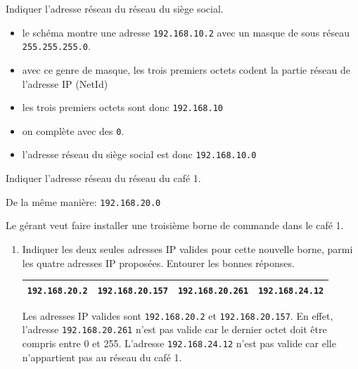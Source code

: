 \documentclass[11pt, a4paper]{report}
\begin{document}
\begin{enumerate}
        \item Indiquer l'adresse réseau du réseau du siège social. 

    \begin{blocvisible}[height=3.5]
        \begin{itemize}
        \item le schéma montre une adresse \verb|192.168.10.2| avec un masque de sous réseau \verb|255.255.255.0|.
        \item avec ce genre de masque, les trois premiers octets codent la partie réseau de l'adresse IP (NetId)
        \item les trois premiers octets sont donc \verb|192.168.10|
        \item on complète avec des \verb|0|.
        \item l'adresse réseau du siège social est donc \verb|192.168.10.0|
        \end{itemize}
       \end{blocvisible}

\begin{minipage}{0.48\linewidth}
    \item Indiquer l'adresse réseau du réseau du café 1. 
\end{minipage}\hfill
    \begin{minipage}{0.48\linewidth}
            \begin{blocvisible}[height=1]
 De la même manière: \verb|192.168.20.0|   \end{blocvisible}
\end{minipage}

\end{enumerate}

\medskip

Le gérant veut faire installer une troisième borne de commande dans le café 1.

\begin{enumerate}[resume]
    \item Indiquer les deux seules adresses IP valides pour cette nouvelle borne, parmi les quatre adresses IP proposées. Entourer les bonnes réponses. 
    \begin{center}
        \begin{tabular}{|c|c|c|c|}
            \hline
            \verb|192.168.20.2| & \verb|192.168.20.157| & \verb|192.168.20.261| & \verb|192.168.24.12|
            \\
            \hline
        \end{tabular}
    \end{center}

    \begin{blocvisible}[height=2]
        Les adresses IP valides sont \verb|192.168.20.2| et \verb|192.168.20.157|. En effet, l'adresse \verb|192.168.20.261| n'est pas valide car le dernier octet doit être compris entre 0 et 255. L'adresse \verb|192.168.24.12| n'est pas valide car elle n'appartient pas au réseau du café 1.
    \end{blocvisible}



\end{enumerate}
    \medskip
\end{document}
